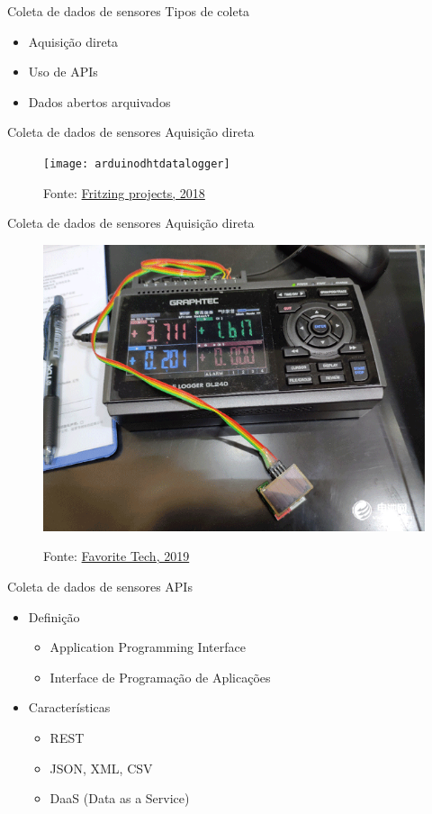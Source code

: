 \documentclass[t]{beamer}
\begin{document}
\begin{frame}{Coleta de dados de sensores}
	Tipos de coleta
	\begin{itemize}
		\item Aquisição direta
		\item Uso de APIs
		\item Dados abertos arquivados
	\end{itemize}
\end{frame}

\begin{frame}{Coleta de dados de sensores}
	Aquisição direta
	\begin{figure}
		\texttt{[image: arduinodhtdatalogger]}
		
		{\scriptsize Fonte: \href{http://fritzing.org/projects/75-arduino-datalogger-temperatura-e-umidita-con-dh}{Fritzing projects, 2018}}
	\end{figure}
\end{frame}

\begin{frame}{Coleta de dados de sensores}
	Aquisição direta
	\begin{figure}
		\includegraphics[width=0.7\linewidth]{graphtecdatalogger}
		
		{\scriptsize Fonte: \href{http://www.favorite-tech.com/en/2019-03-22_73088.html}{Favorite Tech, 2019}}
	\end{figure}
\end{frame}

\begin{frame}{Coleta de dados de sensores}
	APIs
	\begin{itemize}
		\item Definição
		\begin{itemize}
			\item Application Programming Interface
			\item Interface de Programação de Aplicações
		\end{itemize}
		\item Características
		\begin{itemize}
			\item REST
			\item JSON, XML, CSV
			\item DaaS (Data as a Service)
		\end{itemize}
	\end{itemize}
\end{frame}
\end{document}
